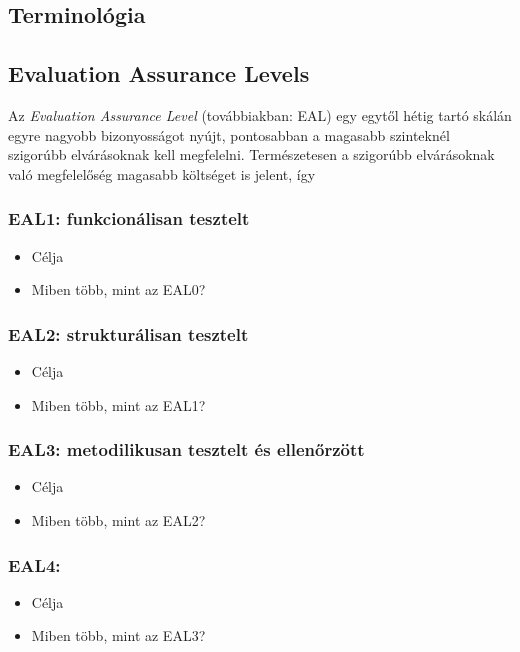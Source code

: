 \subsection{Terminológia}

\subsection{Evaluation Assurance Levels}

Az \emph{Evaluation Assurance Level} (továbbiakban: EAL) egy egytől hétig tartó skálán egyre nagyobb
bizonyosságot nyújt, pontosabban a magasabb szinteknél szigorúbb elvárásoknak kell megfelelni.
Természetesen a szigorúbb elvárásoknak való megfelelőség magasabb költséget is jelent,
így 

\subsubsection{EAL1: funkcionálisan tesztelt}
\begin{itemize}
    \item{Célja}
    \item{Miben több, mint az EAL0?}
\end{itemize}

\subsubsection{EAL2: strukturálisan tesztelt}
\begin{itemize}
    \item{Célja}
    \item{Miben több, mint az EAL1?}
\end{itemize}
\subsubsection{EAL3: metodilikusan tesztelt és ellenőrzött}
\begin{itemize}
    \item{Célja}
    \item{Miben több, mint az EAL2?}
\end{itemize}
\subsubsection{EAL4: }
\begin{itemize}
    \item{Célja}
    \item{Miben több, mint az EAL3?}
\end{itemize}
